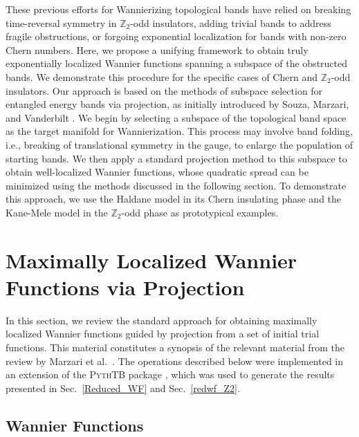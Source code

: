 \documentclass[galley,aps,pra,10pt,amsmath,amssymb,
    superscriptaddress,nofootinbib,longbibliography]{revtex4-2}
\newcounter{comm}
\newcommand{\code}[1]{\textsc{#1}}
\begin{document}
These previous efforts for Wannierizing topological bands have relied on breaking time-reversal symmetry in $\mathbb{Z}_2$-odd insulators, adding trivial bands to address fragile obstructions, or forgoing exponential localization for bands with non-zero Chern numbers. Here, we propose a unifying framework to obtain truly exponentially localized Wannier functions spanning a subspace of the obstructed bands. We demonstrate this procedure for the specific cases of Chern and $\mathbb{Z}_2$-odd insulators. Our approach is based on the methods of subspace selection for entangled energy bands via projection, as initially introduced by Souza, Marzari, and Vanderbilt \cite{souza2001}. We begin by selecting a subspace of the topological band space as the target manifold for Wannierization. This process may involve band folding, i.e., breaking of translational symmetry in the gauge, to enlarge the population of starting bands. We then apply a standard projection method to this subspace to obtain well-localized Wannier functions, whose quadratic spread can be minimized using the methods discussed in the following section. To demonstrate this approach, we use the Haldane model in its Chern insulating phase and the Kane-Mele model in the $\mathbb{Z}_2$-odd phase as prototypical examples.

\section{Maximally Localized Wannier Functions via Projection}
\label{sec:MLWF}

In this section, we review the standard approach for obtaining maximally localized Wannier functions guided by projection from a set of initial trial functions. This material constitutes a synopsis of the relevant material from the review by Marzari et al.~\cite{marzari2012}. The operations described below were implemented in an extension of the \code{PythTB} package \cite{pythtb, trey_cole_2025_14963659}, which was used to generate the results presented in Sec.~\ref{Reduced_WF} and Sec.~\ref{redwf_Z2}.

\subsection{Wannier Functions}
\end{document}
